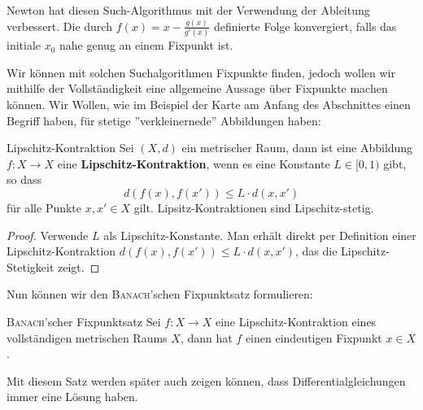 Newton hat diesen Such-Algorithmus mit der Verwendung der Ableitung verbessert. Die durch $f(x) = x - \frac{g(x)}{g'(x)}$ definierte Folge konvergiert, falls das initiale $x_0$ nahe genug an einem Fixpunkt ist.

Wir können mit solchen Suchalgorithmen Fixpunkte finden, jedoch wollen wir mithilfe der Vollständigkeit eine allgemeine Aussage über Fixpunkte machen können. Wir Wollen, wie im Beispiel der Karte am Anfang des Abschnittes einen Begriff haben, für stetige ''verkleinernede'' Abbildungen haben:

\begin{definition}{Lipschitz-Kontraktion}{}
Sei $(X, d)$ ein metrischer Raum, dann ist eine Abbildung $f: X \to X$ eine \textbf{Lipschitz-Kontraktion}, wenn es eine Konstante $L \in [0, 1)$ gibt, so dass
$$d(f(x), f(x')) \leq L \cdot d(x,x')$$
für alle Punkte $x, x' \in X$ gilt. Lipsitz-Kontraktionen sind Lipschitz-stetig.
\end{definition}
\begin{proof}
Verwende $L$ als Lipschitz-Konstante. Man erhält direkt per Definition einer Lipschitz-Kontraktion $d(f(x), f(x')) \leq L \cdot d(x,x')$, das die Lipschitz-Stetigkeit zeigt.
\end{proof}
Nun können wir den \textsc{Banach}'schen Fixpunktsatz formulieren:
\begin{satz}{\textsc{Banach}'scher Fixpunktsatz}{}
Sei $f: X \to X$ eine Lipschitz-Kontraktion eines vollständigen metrischen Raums $X$, dann hat $f$ einen eindeutigen Fixpunkt $x\in X$.
\end{satz}
Mit diesem Satz werden später auch zeigen können, dass Differentialgleichungen immer eine Lösung haben.
